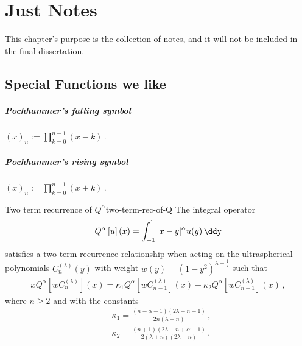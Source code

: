 \chapter*{Just Notes}
This chapter's purpose is the collection of notes, and it will not be included in the final dissertation.

\section*{Special Functions we like}
\paragraph{Pochhammer's falling symbol} $(x)_n := \prod_{k=0}^{n-1} (x-k)\,.$
\paragraph{Pochhammer's rising symbol} $(x)_n := \prod_{k=0}^{n-1} (x+k)\,.$

\begin{theorem}{Two term recurrence of $Q^\alpha$}{two-term-rec-of-Q}
  The integral operator
  \begin{equation*}
    Q^{\alpha} \left[u\right](x) = \int_{-1}^{1} | x-y |^{\alpha} u(y) \,\ddy
  \end{equation*}
  satisfies a two-term recurrence relationship when acting on the ultraspherical polynomials $C_n^{(\lambda)}(y)$ with weight $w(y) = (1-y^2)^{\lambda-\frac{1}{2}}$ such that
  \begin{align*}
    xQ^{\alpha}\left[wC_n^{(\lambda)}\right](x) = \kappa_1 Q^{\alpha}\left[ wC_{n-1}^{(\lambda)}\right](x) +\kappa_2 Q^{\alpha}\left[ w C_{n+1}^{(\lambda)}\right](x)\,,
  \end{align*}
  where $n\geq2$ and with the constants
  \begin{align*}
     & \kappa_1 = \frac{(n-\alpha-1) (2 \lambda +n-1)}{2 n (\lambda +n)}\,,              \\
     & \kappa_2 = \frac{(n+1) (2 \lambda +n+\alpha+1)}{2 (\lambda +n) (2 \lambda +n)}\,.
  \end{align*}
\end{theorem}

